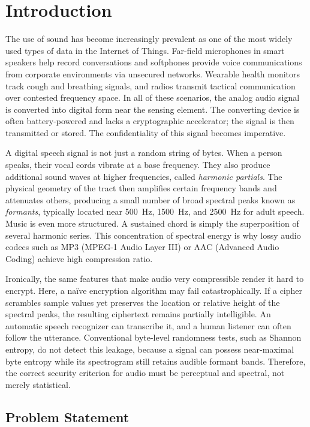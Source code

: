 \documentclass[pdflatex,sn-mathphys-num]{sn-jnl}%
\theoremstyle{thmstyleone}%
\theoremstyle{thmstyletwo}%
\theoremstyle{thmstylethree}%
\begin{document}
\section{Introduction}
\label{sec:intro}

The use of sound has become increasingly prevalent as one of the most widely used types of data in the Internet of Things. Far-field microphones in smart speakers  help record conversations and softphones provide voice communications from corporate environments via unsecured networks. Wearable health monitors track cough and breathing signals, and radios transmit tactical communication over contested frequency space. In all of these scenarios, the analog audio signal is converted into digital form near the sensing element. The converting device is often battery-powered and lacks a cryptographic accelerator; the signal is then transmitted or stored. The confidentiality of this signal becomes imperative. 

A digital speech signal is not just a random string of bytes. When a person speaks, their vocal cords vibrate at a base frequency. They also produce additional sound waves at higher frequencies,  called \emph{harmonic partials}. The physical geometry of the tract then amplifies certain frequency bands and attenuates others, producing a small number of broad spectral peaks known as \emph{formants}, typically located near 500~Hz, 1500~Hz, and 2500~Hz for adult speech. Music is even more structured. A sustained chord is simply the superposition of several harmonic series. This concentration of spectral energy is why lossy audio codecs such as MP3 (MPEG-1 Audio Layer III) or AAC (Advanced Audio Coding) achieve high compression ratio.

Ironically, the same features that make audio very compressible render it hard to encrypt. Here, a na\"ive encryption algorithm may fail catastrophically. If a cipher scrambles sample values yet preserves the location or relative height of the spectral peaks, the resulting ciphertext remains partially intelligible. An automatic speech recognizer can transcribe it, and a human listener can often follow the utterance. Conventional byte-level randomness tests, such as Shannon entropy, do not detect this leakage, because a signal can possess near-maximal byte entropy while its spectrogram still retains audible formant bands. Therefore, the correct security criterion for audio must be perceptual and spectral, not merely statistical.

\subsection{Problem Statement}
\label{sec:redundancy}
\end{document}
